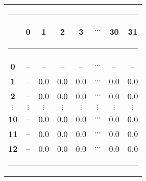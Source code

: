\begin{table}[htb]
\hspace*{1pc}\begin{tabular}{cccccccc}
\multicolumn{8}{l}{\color{cyan}\rule{24pc}{1pt}}\\[2pt]
 & {\bf0} & {\bf1}  & {\bf2} & {\bf3} &  {$\cdots$} & {\bf30} & {\bf31}
\\[-4pt]\multicolumn{8}{l}{\color{cyan}\rule{24pc}{0.5pt}}\\[2pt]
{\bf0} & \hspace*{10pt}--\hspace*{10pt}       & \hspace*{10pt}-- \hspace*{10pt}       &\hspace*{10pt} --
\hspace*{10pt}      & \hspace*{10pt}-- \hspace*{10pt}      &
\hspace*{10pt}$\cdots$ \hspace*{10pt}       &\hspace*{10pt} --\hspace*{10pt}        &\hspace*{10pt}
--\hspace*{10pt}       \\[2pt]
{\bf1} & --       & 0.0        & 0.0       & 0.0       & $\cdots$     & 0.0       & 0.0       \\[2pt]
{\bf2} & --       & 0.0        & 0.0       & 0.0       & $\cdots$     & 0.0       & 0.0       \\[0pt]
{$\vdots$}  &  $\vdots$   &  $\vdots$    &  $\vdots$   &  $\vdots$   &  $\vdots$    &  $\vdots$   & $\vdots$    \\[4pt]
{\bf10} & --       & 0.0        & 0.0       & 0.0       & $\cdots$     & 0.0       & 0.0       \\[2pt]
{\bf11} & --       & 0.0        & 0.0       & 0.0       & $\cdots$     & 0.0       & 0.0       \\[2pt]
{\bf12} & --       & 0.0        & 0.0       & 0.0       & $\cdots$     & 0.0       & 0.0       
\\[-4pt]\multicolumn{8}{l}{\color{cyan}\rule{24pc}{1pt}}
\end{tabular}
\endTB
\end{table}


